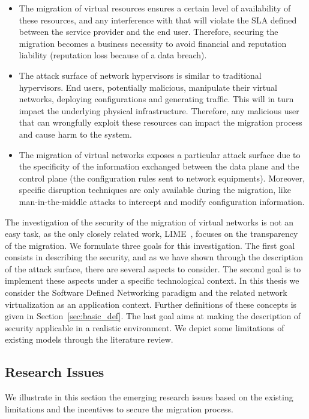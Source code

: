 \begin{itemize}
    
    \item The migration of virtual resources ensures a certain level of availability of these resources, and any interference with that will violate the SLA defined between the service provider and the end user.
    Therefore, securing the migration becomes a business necessity to avoid financial and reputation liability (\eg reputation loss because of a data breach).
    
    \item The attack surface of network hypervisors is similar to traditional hypervisors. End users, potentially malicious, manipulate their virtual networks, deploying configurations and generating traffic. This will in turn impact the underlying physical infrastructure. Therefore, any malicious user that can wrongfully exploit these resources can impact the migration process and cause harm to the system.

    \item The migration of virtual networks exposes a particular attack surface due to the specificity of the information exchanged between the data plane and the control plane (\eg the configuration rules sent to network equipments). Moreover, specific disruption techniques are only available during the migration, like man-in-the-middle attacks to intercept and modify configuration information.  
\end{itemize}

The investigation of the security of the migration of virtual networks is not an easy task, as the only closely related work, LIME~\cite{Lime-Ghorbani2014}, focuses on the transparency of the migration. 
We formulate three goals for this investigation.
The first goal consists in describing the security, and as we have shown through the description of the attack surface, there are several aspects to consider. 
The second goal is to implement these aspects under a specific technological context. In this thesis we consider the Software Defined Networking paradigm and the related network virtualization as an application context. Further definitions of these concepts is given in Section~\ref{sec:basic_def}. 
The last goal aims at making the description of security applicable in a realistic environment.
We depict some limitations of existing models through the literature review.


\subsection{Research Issues}
We illustrate in this section the emerging research issues based on the existing limitations and the incentives to secure the migration process.

